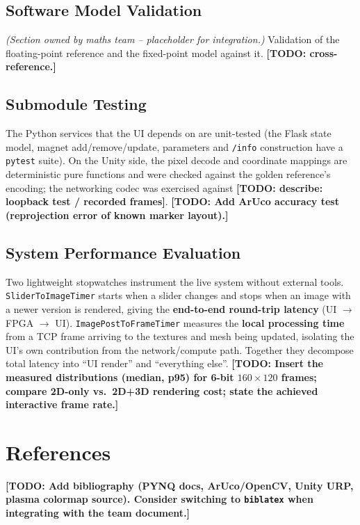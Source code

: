 \documentclass[11pt,a4paper]{article}
\newcommand{\todo}[1]{\textcolor{red!75!black}{\textbf{[TODO: #1]}}}
\newcommand{\owned}[1]{\textit{\small(Section owned by #1 -- placeholder for integration.)}}
\begin{document}
\subsection{Software Model Validation}
\owned{maths team} Validation of the floating-point reference and the
fixed-point model against it. \todo{cross-reference.}

\subsection{Submodule Testing}
The Python services that the UI depends on are unit-tested (the Flask state
model, magnet add/remove/update, parameters and \texttt{/info} construction have
a \texttt{pytest} suite). On the Unity side, the pixel decode and coordinate
mappings are deterministic pure functions and were checked against the golden
reference's encoding; the networking codec was exercised against
\todo{describe: loopback test / recorded frames}. \todo{Add ArUco accuracy test
(reprojection error of known marker layout).}

\subsection{System Performance Evaluation}
Two lightweight stopwatches instrument the live system without external tools.
\texttt{SliderToImageTimer} starts when a slider changes and stops when an image
with a newer version is rendered, giving the \textbf{end-to-end round-trip
latency} (UI $\rightarrow$ FPGA $\rightarrow$ UI). \texttt{ImagePostToFrameTimer}
measures the \textbf{local processing time} from a TCP frame arriving to the
textures and mesh being updated, isolating the UI's own contribution from the
network/compute path. Together they decompose total latency into ``UI render''
and ``everything else''. \todo{Insert the measured distributions (median,
p95) for 6-bit $160\times120$ frames; compare 2D-only vs.\ 2D+3D rendering
cost; state the achieved interactive frame rate.}

\section*{References}
\todo{Add bibliography (PYNQ docs, ArUco/OpenCV, Unity URP, plasma colormap
source). Consider switching to \texttt{biblatex} when integrating with the team
document.}

\appendix
\end{document}
